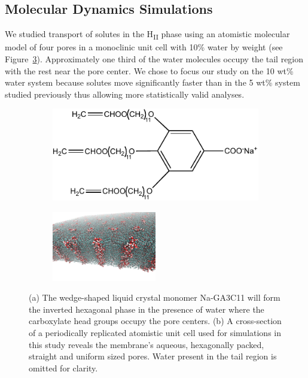 \documentclass[aps,pre,preprint,groupedaddress]{revtex4-2}
\begin{document}
  \subsection{Molecular Dynamics Simulations}

  We studied transport of solutes in the H\textsubscript{II} phase using an atomistic
  molecular model of four pores in a monoclinic unit cell with 10\% water by weight 
  (see Figure~\ref{fig:membrane_structure}). Approximately one third of the water 
  molecules occupy the tail region with the rest near the pore center. We chose to
  focus our study on the 10 wt\% water system because solutes move significantly 
  faster than in the 5 wt\% system studied previously thus allowing more statistically
  valid analyses.
  
  \begin{figure}
  \centering
  \begin{subfigure}{0.4\textwidth}
  \centering
  \includegraphics[width=\textwidth]{NaGA3C11.pdf}
  \caption{}\label{fig:monomer_structure}
  \end{subfigure}
  \begin{subfigure}{0.5\textwidth}
  \centering
  \includegraphics[width=0.5\textwidth]{membrane_profile.pdf}
  \caption{}\label{fig:membrane_profile}
  \end{subfigure}
  \caption{(a) The wedge-shaped liquid crystal monomer Na-GA3C11 will form the inverted
  hexagonal phase in the presence of water where the carboxylate head groups occupy the
  pore centers. (b) A cross-section of a periodically replicated atomistic unit cell 
  used for simulations in this study reveals the membrane's aqueous, hexagonally packed,
  straight and uniform sized pores. Water present in the tail region is omitted 
  for clarity.}\label{fig:membrane_structure}
  \end{figure}
  
\end{document}
